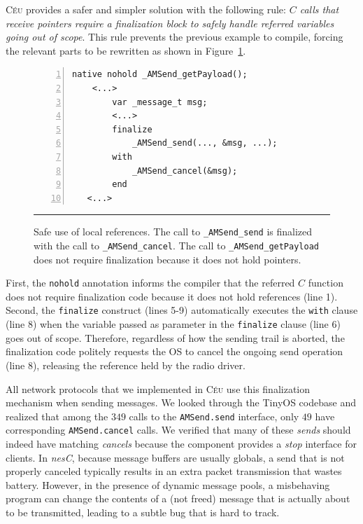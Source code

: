 \documentclass[letterpaper]{sig-alternate}
\newcommand{\code}[1] {{\small{\texttt{#1}}}}
\newcommand{\CEU}{\textsc{C\'{e}u}\xspace}
\begin{document}
\CEU provides a safer and simpler solution with the following rule:
\emph{$C$ calls that receive pointers require a finalization block to safely 
handle referred variables going out of scope}.
This rule prevents the previous example to compile, forcing the relevant parts 
to be rewritten as shown in Figure~\ref{lst.local.ok}.

\begin{figure}[t]
\begin{lstlisting}[numbers=left,xleftmargin=2.5em]
native nohold _AMSend_getPayload();
    <...>
        var _message_t msg;
        <...>
        finalize
            _AMSend_send(..., &msg, ...);
        with
            _AMSend_cancel(&msg);
        end
   <...>
\end{lstlisting}
%
\rule{8.5cm}{0.37pt}
\caption{ Safe use of local references. \newline
{\small %
The call to \code{\_AMSend\_send} is finalized with the call to 
\code{\_AMSend\_cancel}.
%
The call to \code{\_AMSend\_getPayload} does not require finalization because 
it does not hold pointers.
}
\label{lst.local.ok}
}
\end{figure}

First, the \code{nohold} annotation informs the compiler that the referred $C$ 
function does not require finalization code because it does not hold references 
(line 1).
Second, the \code{finalize} construct (lines 5-9) automatically executes the 
\code{with} clause (line 8) when the variable passed as parameter in the 
\code{finalize} clause (line 6) goes out of scope.
Therefore, regardless of how the sending trail is aborted, the finalization 
code politely requests the OS to cancel the ongoing send operation (line 8), 
releasing the reference held by the radio driver.

All network protocols that we implemented in \CEU use this finalization 
mechanism when sending messages.
%
We looked through the TinyOS codebase and realized that among the $349$ calls 
to the \code{AMSend.send} interface, only $49$ have corresponding 
\code{AMSend.cancel} calls.
We verified that many of these \emph{sends} should indeed have matching 
\emph{cancels} because the component provides a \emph{stop} interface for 
clients.
In \emph{nesC}, because message buffers are usually globals, a send that is not 
properly canceled typically results in an extra packet transmission that 
wastes battery.
However, in the presence of dynamic message pools, a misbehaving program can 
change the contents of a (not freed) message that is actually about to be 
transmitted, leading to a subtle bug that is hard to track.
\end{document}
